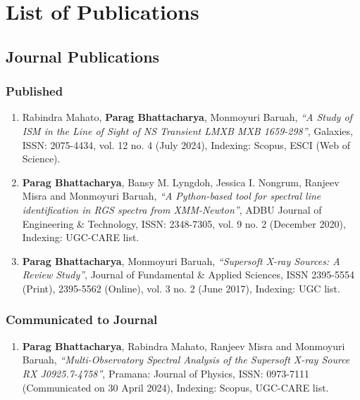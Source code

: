 \chapter{List of Publications} \label{appendix:publications}

    \section{Journal Publications}
    	\subsection{Published}
    		\begin{enumerate}
    			\item Rabindra Mahato, \textbf{Parag Bhattacharya}, Monmoyuri Baruah, \textit{``A Study of ISM in the Line of Sight of NS Transient LMXB MXB 1659-298''}, Galaxies, ISSN: 2075-4434, vol. 12 no. 4 (July 2024), Indexing: Scopus, ESCI (Web of Science).
    			
    			\item \textbf{Parag Bhattacharya}, Bansy M. Lyngdoh, Jessica I. Nongrum, Ranjeev Misra and Monmoyuri Baruah, \textit{``A Python-based tool for spectral line identification in RGS spectra from XMM-Newton''}, ADBU Journal of Engineering \& Technology, ISSN: 2348-7305, vol. 9 no. 2 (December 2020), Indexing: UGC-CARE list.

    			\item \textbf{Parag Bhattacharya}, Monmoyuri Baruah, \textit{``Supersoft X-ray Sources: A Review Study''}, Journal of Fundamental \& Applied Sciences, ISSN 2395-5554 (Print), 2395-5562 (Online), vol. 3 no. 2 (June 2017), Indexing: UGC list.
    		\end{enumerate}
    	
    		
    	\subsection{Communicated to Journal}
    		\begin{enumerate}
    			\item \textbf{Parag Bhattacharya}, Rabindra Mahato, Ranjeev Misra and Monmoyuri Baruah, \textit{``Multi-Observatory Spectral Analysis of the Supersoft X-ray Source RX J0925.7-4758''}, Pramana: Journal of Physics, ISSN: 0973-7111 (Communicated on 30 April 2024), Indexing: Scopus, UGC-CARE list.
    		\end{enumerate}
    
